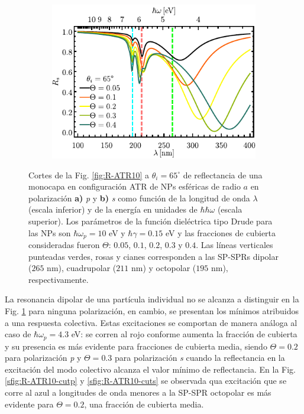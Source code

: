 \begin{figure}[h!]
\begin{subfigure}{.45\linewidth}
	\includegraphics[scale=1 ]{2-Resultados/figs/2-Wp10ThetaVar/cut_angle_65_s.pdf}\end{subfigure}\vspace*{-.5em}
	\caption{Cortes de la Fig. \ref{fig:R-ATR10} a $\theta_i = 65^\circ$ de reflectancia de una monocapa en configuración ATR de NPs esféricas de radio $a$ en polarización \textbf{a)} \emph{p} y \textbf{b)} \emph{s} como función de la longitud de onda $\lambda$ (escala inferior) y de la energía en unidades de $\hbar \hbar\omega$ (escala superior). Los parámetros de la función dieléctrica tipo Drude para las NPs son $\hbar\omega_p = 10$ eV y $\hbar\gamma = 0.15$ eV y las fracciones de cubierta consideradas fueron $\Theta$: $0. 05$, $0. 1$, $0. 2$, $0. 3$ y $0. 4$. Las líneas verticales punteadas verdes, rosas y cianes corresponden a las SP-SPRs dipolar ($265$ nm), cuadrupolar ($211$ nm) y octopolar ($195$ nm), respectivamente.  }\label{fig:R-ATR10-Cuts}
	\end{figure}	

La resonancia dipolar de una partícula individual no se alcanza a distinguir en la Fig. \ref{fig:R-ATR10-Cuts} para ninguna polarización, en cambio, se presentan los mínimos atribuidos a una respuesta colectiva. Estas excitaciones se comportan de manera análoga al caso de $\hbar\omega_p = 4.3$ eV: se corren al rojo conforme aumenta la fracción de cubierta y su presencia es más evidente para fracciones de cubierta media, siendo  $\Theta=0.2$ para polarización \emph{p} y $\Theta=0.3$ para polarización \emph{s} cuando la reflectancia en la excitación del modo colectivo alcanza el valor mínimo de reflectancia. En la Fig. \ref{sfig:R-ATR10-cutp} y \ref{sfig:R-ATR10-cuts}  se observada qua excitación que se corre al azul a longitudes de onda menores a la SP-SPR octopolar es más evidente para $\Theta=0.2$, una fracción de cubierta media.

